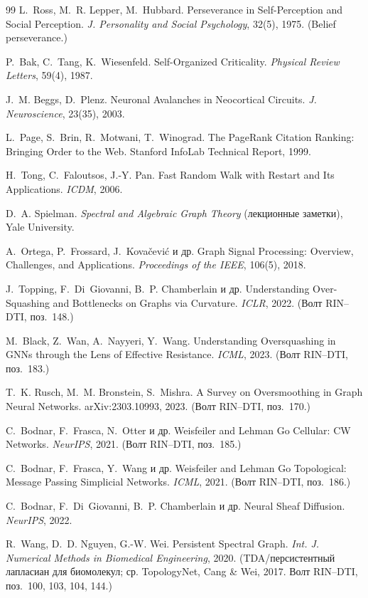 \begin{thebibliography}{99}
 L.~Ross, M.~R. Lepper, M.~Hubbard.
Perseverance in Self-Perception and Social Perception.
\emph{J. Personality and Social Psychology}, 32(5), 1975. (Belief perseverance.)

 P.~Bak, C.~Tang, K.~Wiesenfeld.
Self-Organized Criticality. \emph{Physical Review Letters}, 59(4), 1987.

 J.~M. Beggs, D.~Plenz.
Neuronal Avalanches in Neocortical Circuits. \emph{J. Neuroscience}, 23(35), 2003.

 L.~Page, S.~Brin, R.~Motwani, T.~Winograd.
The PageRank Citation Ranking: Bringing Order to the Web. Stanford InfoLab Technical Report, 1999.

 H.~Tong, C.~Faloutsos, J.-Y. Pan.
Fast Random Walk with Restart and Its Applications. \emph{ICDM}, 2006.

 D.~A. Spielman.
\emph{Spectral and Algebraic Graph Theory} (лекционные заметки), Yale University.

 A.~Ortega, P.~Frossard, J.~Kova\v{c}evi\'c и др.
Graph Signal Processing: Overview, Challenges, and Applications.
\emph{Proceedings of the IEEE}, 106(5), 2018.

 J.~Topping, F.~Di~Giovanni, B.~P. Chamberlain и др.
Understanding Over-Squashing and Bottlenecks on Graphs via Curvature.
\emph{ICLR}, 2022. (Волт RIN–DTI, поз.~148.)

 M.~Black, Z.~Wan, A.~Nayyeri, Y.~Wang.
Understanding Oversquashing in GNNs through the Lens of Effective Resistance.
\emph{ICML}, 2023. (Волт RIN–DTI, поз.~183.)

 T.~K. Rusch, M.~M. Bronstein, S.~Mishra.
A Survey on Oversmoothing in Graph Neural Networks. arXiv:2303.10993, 2023.
(Волт RIN–DTI, поз.~170.)

 C.~Bodnar, F.~Frasca, N.~Otter и др.
Weisfeiler and Lehman Go Cellular: CW Networks. \emph{NeurIPS}, 2021.
(Волт RIN–DTI, поз.~185.)

 C.~Bodnar, F.~Frasca, Y.~Wang и др.
Weisfeiler and Lehman Go Topological: Message Passing Simplicial Networks.
\emph{ICML}, 2021. (Волт RIN–DTI, поз.~186.)

 C.~Bodnar, F.~Di~Giovanni, B.~P. Chamberlain и др.
Neural Sheaf Diffusion. \emph{NeurIPS}, 2022.

 R.~Wang, D.~D. Nguyen, G.-W. Wei.
Persistent Spectral Graph. \emph{Int. J. Numerical Methods in Biomedical
Engineering}, 2020. (TDA/персистентный лапласиан для биомолекул; ср. TopologyNet,
Cang \& Wei, 2017. Волт RIN–DTI, поз.~100, 103, 104, 144.)


\end{thebibliography}
